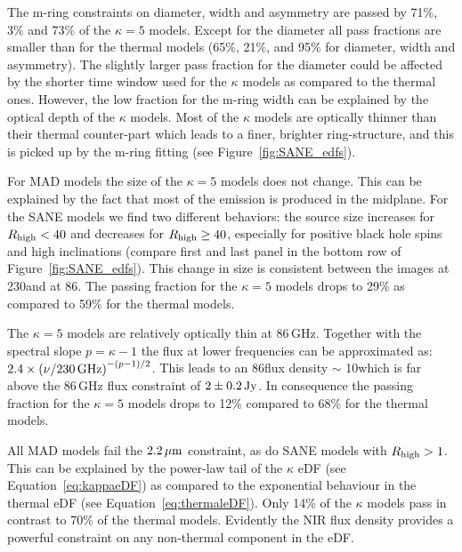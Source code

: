 
The m-ring constraints on diameter, width and asymmetry are passed by 71\%, 3\% and 73\% of the $\kappa=5$ models.
Except for the diameter all pass fractions are smaller than for the thermal models (65\%, 21\%, and 95\% for diameter, width and asymmetry).
The slightly larger pass fraction for the diameter could be affected by the shorter time window used for the $\kappa$ models as compared to the thermal ones.
However, the low fraction for the m-ring width can be explained by the optical depth of the $\kappa$ models.
Most of the $\kappa$ models are optically thinner than their thermal counter-part which leads to a finer, brighter ring-structure, and this is picked up by the m-ring fitting (see Figure~\ref{fig:SANE_edfs}).


For MAD models the size of the $\kappa=5$ models does not change.
This can be explained by the fact that most of the emission is produced in the midplane.
For the SANE models we find two different behaviors: the source size increases for $R_\mathrm{high} < 40$ and decreases for $R_\mathrm{high} \geq 40$, especially for positive black hole spins and high inclinations (compare first and last panel in the bottom row of Figure~\ref{fig:SANE_edfs}).
This change in size is consistent between the images at 230\GHz and at 86\GHz.
The passing fraction for the $\kappa=5$ models drops to 29\% as compared to 59\% for the thermal models.


The $\kappa=5$ models are relatively optically thin at 86\,GHz.
Together with the spectral slope $p=\kappa-1$ the flux at lower frequencies can be approximated as: $2.4\times \left(\nu/230\,\mathrm{GHz}\right)^{-(p-1)/2}$.
This leads to an 86\GHz flux density $\sim$ 10\Jy which is far above the 86\,GHz flux constraint of $2\pm0.2\,\mathrm{Jy}$.
In consequence the passing fraction for the $\kappa=5$ models drops to 12\% compared to 68\% for the thermal models.


All MAD models fail the $2.2\,\mu\mathrm{m}$ constraint, as do SANE models with $R_\mathrm{high}>1$.
This can be explained by the power-law tail of the $\kappa$ eDF (see Equation~\ref{eq:kappaeDF}) as compared to the exponential behaviour in the thermal eDF (see Equation~\ref{eq:thermaleDF}).
Only 14\% of the $\kappa$ models pass in contrast to 70\% of the thermal models.  Evidently the NIR flux density provides a powerful constraint on any non-thermal component in the eDF.

